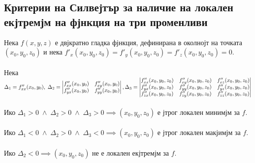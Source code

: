 \documentclass[14pt]{extarticle}
\begin{document}
\subsection*{Критерии на Силвејтър за наличие на локален екјтремјм на фјнкция на три променливи}
Нека \(f(x,y,z)\) е двјкратно гладка фјнкция, дефинирана в околнојт на точката \((x_0,y_0, z_0)\) и нека \(f'_x(x_0, y_0, z_0) = f'_y(x_0,y_0, z_0) = f'_z(x_0,y_0, z_0) = 0\). \\\\
Нека \(\Delta_1 = f''_{xx}(x_0, y_0), \; \Delta_2 = \begin{vmatrix}
    f''_{xx}(x_0, y_0) & f''_{xy}(x_0, y_0) \\
    f''_{yx}(x_0, y_0) & f''_{yy}(x_0, y_0)
\end{vmatrix}, \\\\\\
\Delta_3 = \begin{vmatrix}
    f''_{xx}(x_0, y_0, z_0) & f''_{xy}(x_0, y_0, z_0) & f''_{xz}(x_0, y_0, z_0) \\
    f''_{yx}(x_0, y_0, z_0) & f''_{yy}(x_0, y_0, z_0) & f''_{yz}(x_0, y_0, z_0) \\
    f''_{zx}(x_0, y_0, z_0) & f''_{zy}(x_0, y_0, z_0) & f''_{zz}(x_0, y_0, z_0)
\end{vmatrix} \)\\\\
Ико \(\Delta_1 > 0 \; \land \; \Delta_2 > 0 \; \land \; \Delta_3 > 0 \implies (x_0, y_0, z_0)\) е јтрог локален минимјм за \(f\). \\\\
Ико \(\Delta_1 < 0 \; \land \; \Delta_2 > 0 \; \land \; \Delta_3 < 0 \implies (x_0, y_0, z_0)\) е јтрог локален макјимјм за \(f\). \\\\
Ико \(\Delta_2 < 0 \implies (x_0, y_0, z_0)\) не е локален екјтремјм за \(f\).
\end{document}
